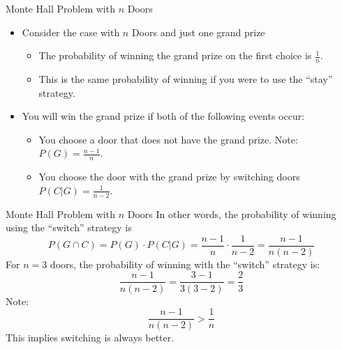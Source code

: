\documentclass[
  ignorenonframetext,
]{beamer}
\providecommand{\tightlist}{%
  \setlength{\itemsep}{0pt}\setlength{\parskip}{0pt}}
\begin{document}
\begin{frame}{Monte Hall Problem with \(n\) Doors}
\label{monte-hall-problem-with-n-doors}
\begin{itemize}
\item
  Consider the case with \(n\) Doors and just one grand prize

  \begin{itemize}
  \tightlist
  \item
    The probability of winning the grand prize on the first choice is
    \(\frac{1}{n}\).
  \item
    This is the same probability of winning if you were to use the
    ``stay'' strategy.
  \end{itemize}
\item
  You will win the grand prize if both of the following events occur:

  \begin{itemize}
  \tightlist
  \item
    You choose a door that does not have the grand prize. Note:
    \(P(G)=\frac{n-1}{n}\).
  \item
    You choose the door with the grand prize by switching doors
    \(P(C|G)=\frac{1}{n-2}\).
  \end{itemize}
\end{itemize}
\end{frame}

\begin{frame}{Monte Hall Problem with \(n\) Doors}
\label{monte-hall-problem-with-n-doors-1}
In other words, the probability of winning using the ``switch'' strategy
is
\[P(G \cap C)=P(G)\cdot P(C|G)=\frac{n-1}{n}\cdot \frac{1}{n-2}=\frac{n-1}{n(n-2)}\]
For \(n=3\) doors, the probability of winning with the ``switch''
strategy is: \[\frac{n-1}{n(n-2)}=\frac{3-1}{3(3-2)}=\frac{2}{3}\] Note:
\[\frac{n-1}{n(n-2)}> \frac{1}{n}\] This implies switching is always
better.
\end{frame}
\end{document}

